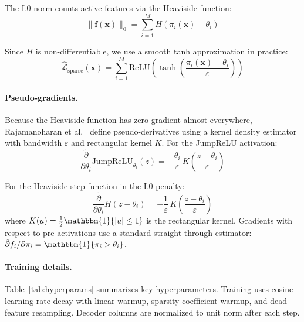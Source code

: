 \documentclass[runningheads]{llncs}
\begin{document}
The L0 norm counts active features via the Heaviside function:
\begin{equation}
\|\mathbf{f}(\mathbf{x})\|_0 = \sum_{i=1}^{M} H(\pi_i(\mathbf{x}) - \theta_i)
\end{equation}

Since $H$ is non-differentiable, we use a smooth tanh approximation in practice:
\begin{equation}
\hat{\mathcal{L}}_\text{sparse}(\mathbf{x}) = \sum_{i=1}^{M} \text{ReLU}\!\left(\tanh\!\left(\frac{\pi_i(\mathbf{x}) - \theta_i}{\varepsilon}\right)\right)
\end{equation}

\paragraph{Pseudo-gradients.} Because the Heaviside function has zero gradient almost everywhere, Rajamanoharan et al.~\cite{ref_rajamanoharan2024} define pseudo-derivatives using a kernel density estimator with bandwidth $\varepsilon$ and rectangular kernel $K$. For the JumpReLU activation:
\begin{equation}
\frac{\tilde{\partial}}{\partial \theta_i} \text{JumpReLU}_{\theta_i}(z) = -\frac{\theta_i}{\varepsilon}\, K\!\left(\frac{z - \theta_i}{\varepsilon}\right)
\end{equation}

For the Heaviside step function in the L0 penalty:
\begin{equation}
\frac{\tilde{\partial}}{\partial \theta_i} H(z - \theta_i) = -\frac{1}{\varepsilon}\, K\!\left(\frac{z - \theta_i}{\varepsilon}\right)
\end{equation}
where $K(u) = \frac{1}{2}\mathbbm{1}\{|u| \leq 1\}$ is the rectangular kernel. Gradients with respect to pre-activations use a standard straight-through estimator: $\tilde{\partial} f_i / \partial \pi_i = \mathbbm{1}\{\pi_i > \theta_i\}$.

\paragraph{Training details.} Table~\ref{tab:hyperparams} summarizes key hyperparameters. Training uses cosine learning rate decay with linear warmup, sparsity coefficient warmup, and dead feature resampling. Decoder columns are normalized to unit norm after each step.
\end{document}
